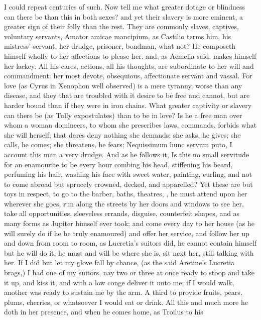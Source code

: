 I could repeat centuries of such. Now tell me what greater dotage or
blindness can there be than this in both sexes? and yet their slavery
is more eminent, a greater sign of their folly than the rest.
They are commonly slaves, captives, voluntary servants, Amator amicae
mancipium, as Castilio terms him, his mistress' servant, her
drudge, prisoner, bondman, what not? He composeth himself wholly to her
affections to please her, and, as Aemelia said, makes himself her
lackey. All his cares, actions, all his thoughts, are subordinate to
her will and commandment: her most devote, obsequious, affectionate
servant and vassal. For love (as Cyrus in Xenophon well observed)
is a mere tyranny, worse than any disease, and they that are troubled
with it desire to be free and cannot, but are harder bound than if they
were in iron chains. What greater captivity or slavery can there be (as
Tully expostulates) than to be in love? Is he a free man over
whom a woman domineers, to whom she prescribes laws, commands, forbids
what she will herself; that dares deny nothing she demands; she asks,
he gives; she calls, he comes; she threatens, he fears; Nequissimum
hunc servum puto, I account this man a very drudge. And as he follows
it, Is this no small servitude for an enamourite to be every hour
combing his head, stiffening his beard, perfuming his hair, washing his
face with sweet water, painting, curling, and not to come abroad but
sprucely crowned, decked, and apparelled? Yet these are but toys in
respect, to go to the barber, baths, theatres, \etc{}, he must attend upon
her wherever she goes, run along the streets by her doors and windows
to see her, take all opportunities, sleeveless errands, disguise,
counterfeit shapes, and as many forms as Jupiter himself ever took; and
come every day to her house (as he will surely do if he be truly
enamoured) and offer her service, and follow her up and down from room
to room, as Lucretia's suitors did, he cannot contain himself but he
will do it, he must and will be where she is, sit next her, still
talking with her. If I did but let my glove fall by chance, (as
the said Aretine's Lucretia brags,) I had one of my suitors, nay two or
three at once ready to stoop and take it up, and kiss it, and with a
low conge deliver it unto me; if I would walk, another was ready to
sustain me by the arm. A third to provide fruits, pears, plums,
cherries, or whatsoever I would eat or drink. All this and much more he
doth in her presence, and when he comes home, as Troilus to his
